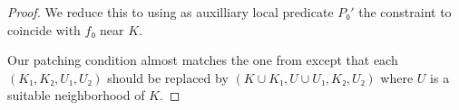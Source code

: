\begin{proof}
  We reduce this to  using as auxilliary
  local predicate $P₀'$ the constraint to coincide with $f₀$ near $K$.

  Our patching condition almost matches the one from 
  except that each $(K₁, K₂, U₁, U₂)$ should be replaced by $(K ∪ K₁, U ∪ U₁, K₂, U₂)$
  where $U$ is a suitable neighborhood of $K$.
\end{proof}
